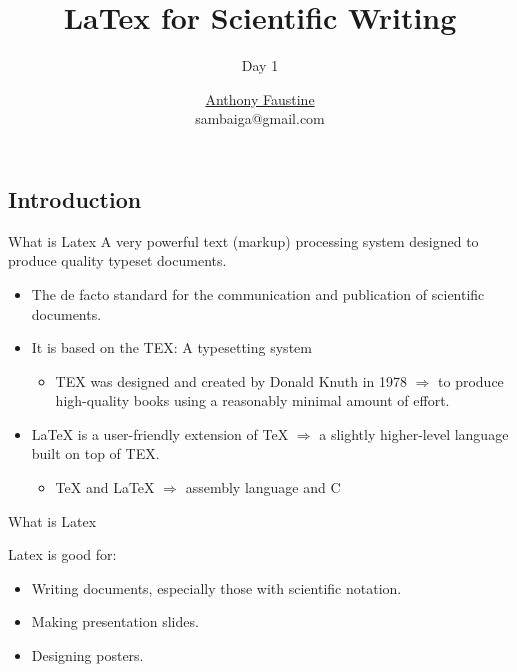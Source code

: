 \documentclass{beamer}
\title{ LaTex for Scientific Writing} %
\subtitle{Day 1} %
\author{\href{sambaiga.github.io}{Anthony Faustine} \\sambaiga@gmail.com}
\begin{document}
  \frame{\maketitle}


  \begin{darkframes}
    
\section{Introduction}
  \begin{frame}[<+->]{What is Latex}
  	A very powerful text (markup) processing system designed to produce quality typeset
  	documents.
  	\begin{itemize}
  		\item The de facto standard for the communication and publication of scientific documents.
  		\item It is based on the TEX: A typesetting system
  		\begin{itemize}
  			\item TEX was designed and created by Donald Knuth in 1978 $\Rightarrow$ to produce high-quality books using a
  			reasonably minimal amount of effort.
  		\end{itemize}
  		\item LaTeX is a user-friendly extension of TeX $\Rightarrow$  a slightly higher-level language built on top of TEX.
  		\begin{itemize}
  			\item TeX and LaTeX $\Rightarrow$ assembly language and C
  		\end{itemize}
  		
  	\end{itemize}
  \end{frame} 

   \begin{frame}[<+->]{What is Latex}
   	
   	\begin{block}{Latex is good for:}
   		\begin{itemize}
   			\item Writing documents, especially those with scientific notation.
   			\item Making presentation slides.
   			\item Designing posters.
   		\end{itemize}
   	\end{block}
   \end{frame}
   

\end{darkframes}
\end{document}
